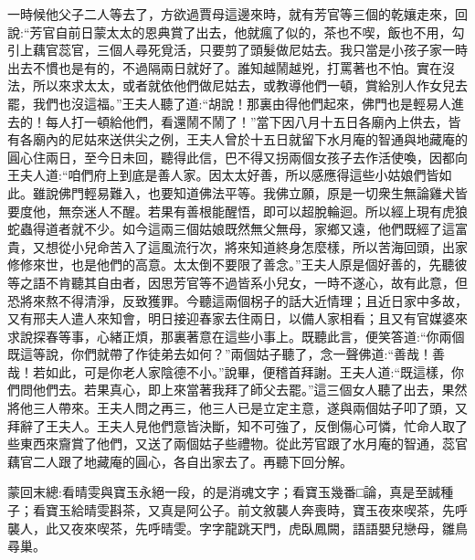 \begin{parag}
    一時候他父子二人等去了，方欲過賈母這邊來時，就有芳官等三個的乾孃走來，回說:“芳官自前日蒙太太的恩典賞了出去，他就瘋了似的，茶也不喫，飯也不用，勾引上藕官蕊官，三個人尋死覓活，只要剪了頭髮做尼姑去。我只當是小孩子家一時出去不慣也是有的，不過隔兩日就好了。誰知越鬧越兇，打罵著也不怕。實在沒法，所以來求太太，或者就依他們做尼姑去，或教導他們一頓，賞給別人作女兒去罷，我們也沒這福。”王夫人聽了道:“胡說！那裏由得他們起來，佛門也是輕易人進去的！每人打一頓給他們，看還鬧不鬧了！”當下因八月十五日各廟內上供去，皆有各廟內的尼姑來送供尖之例，王夫人曾於十五日就留下水月庵的智通與地藏庵的圓心住兩日，至今日未回，聽得此信，巴不得又拐兩個女孩子去作活使喚，因都向王夫人道:“咱們府上到底是善人家。因太太好善，所以感應得這些小姑娘們皆如此。雖說佛門輕易難入，也要知道佛法平等。我佛立願，原是一切衆生無論雞犬皆要度他，無奈迷人不醒。若果有善根能醒悟，即可以超脫輪迴。所以經上現有虎狼蛇蟲得道者就不少。如今這兩三個姑娘既然無父無母，家鄉又遠，他們既經了這富貴，又想從小兒命苦入了這風流行次，將來知道終身怎麼樣，所以苦海回頭，出家修修來世，也是他們的高意。太太倒不要限了善念。”王夫人原是個好善的，先聽彼等之語不肯聽其自由者，因思芳官等不過皆系小兒女，一時不遂心，故有此意，但恐將來熬不得清淨，反致獲罪。今聽這兩個柺子的話大近情理；且近日家中多故，又有邢夫人遣人來知會，明日接迎春家去住兩日，以備人家相看；且又有官媒婆來求說探春等事，心緒正煩，那裏著意在這些小事上。既聽此言，便笑答道:“你兩個既這等說，你們就帶了作徒弟去如何？”兩個姑子聽了，念一聲佛道:“善哉！善哉！若如此，可是你老人家陰德不小。”說畢，便稽首拜謝。王夫人道:“既這樣，你們問他們去。若果真心，即上來當著我拜了師父去罷。”這三個女人聽了出去，果然將他三人帶來。王夫人問之再三，他三人已是立定主意，遂與兩個姑子叩了頭，又拜辭了王夫人。王夫人見他們意皆決斷，知不可強了，反倒傷心可憐，忙命人取了些東西來齎賞了他們，又送了兩個姑子些禮物。從此芳官跟了水月庵的智通，蕊官藕官二人跟了地藏庵的圓心，各自出家去了。再聽下回分解。
\end{parag}


\begin{parag}
    \begin{note}蒙回末總:看晴雯與寶玉永絕一段，的是消魂文字；看寶玉幾番□論，真是至誠種子；看寶玉給晴雯斟茶，又真是阿公子。前文敘襲人奔喪時，寶玉夜來喫茶，先呼襲人，此又夜來喫茶，先呼晴雯。字字龍跳天門，虎臥鳳闕，語語嬰兒戀母，雛鳥尋巢。\end{note}
\end{parag}
